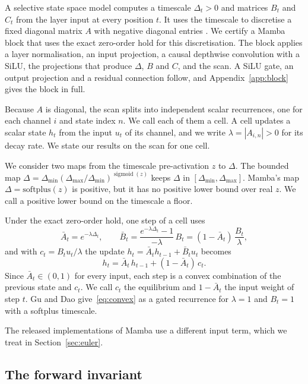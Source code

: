 \documentclass[11pt, a4paper]{article}
\theoremstyle{remark}
\theoremstyle{plain}
\newcommand{\Abar}{\bar{A}}
\newcommand{\Bbar}{\bar{B}}
\begin{document}
A selective state space model computes a timescale $\Delta_t > 0$ and matrices $B_t$ and $C_t$
from the layer input at every position $t$. It uses the timescale to discretise a fixed diagonal
matrix $A$ with negative diagonal entries \citep{gu2023mamba}. We certify a Mamba block that uses
the exact zero-order hold for this discretisation. The block applies a layer normalisation, an
input projection, a causal depthwise convolution with a SiLU, the projections that produce
$\Delta$, $B$ and $C$, and the scan. A SiLU gate, an output projection and a residual connection
follow, and Appendix~\ref{app:block} gives the block in full.

Because $A$ is diagonal, the scan splits into independent scalar recurrences, one for each channel
$i$ and state index $n$. We call each of them a cell. A cell updates a scalar state $h_t$ from the
input $u_t$ of its channel, and we write $\lambda = |A_{i,n}| > 0$ for its decay rate. We state
our results on the scan for one cell.

We consider two maps from the timescale pre-activation $z$ to $\Delta$. The bounded map
$\Delta = \Delta_{\min}(\Delta_{\max}/\Delta_{\min})^{\operatorname{sigmoid}(z)}$ keeps $\Delta$
in $[\Delta_{\min}, \Delta_{\max}]$. Mamba's map $\Delta = \mathrm{softplus}(z)$ is positive, but
it has no positive lower bound over real $z$. We call a positive lower bound on the timescale a
floor.

Under the exact zero-order hold, one step of a cell uses
\begin{equation}
\label{eq:zoh}
  \Abar_t = e^{-\lambda\Delta_t},
  \qquad
  \Bbar_t = \frac{e^{-\lambda\Delta_t} - 1}{-\lambda}\, B_t = (1 - \Abar_t)\,\frac{B_t}{\lambda},
\end{equation}
and with $c_t = B_t u_t/\lambda$ the update $h_t = \Abar_t h_{t-1} + \Bbar_t u_t$ becomes
\begin{equation}
\label{eq:convex}
  h_t = \Abar_t\, h_{t-1} + (1 - \Abar_t)\, c_t .
\end{equation}
Since $\Abar_t \in (0,1)$ for every input, each step is a convex combination of the previous state
and $c_t$. We call $c_t$ the equilibrium and $1 - \Abar_t$ the input weight of step $t$. Gu and Dao
\citep[Theorem~1]{gu2023mamba} give~\eqref{eq:convex} as a gated recurrence for $\lambda = 1$ and
$B_t = 1$ with a softplus timescale.

The released implementations of Mamba use a different input term, which we treat in
Section~\ref{sec:euler}.

\subsection{The forward invariant}
\end{document}

